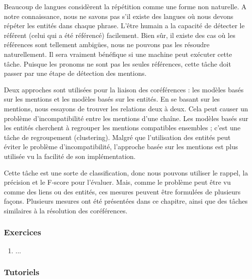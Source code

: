 \documentclass{KodeBook}
\begin{document}
\begin{discussion}
Beaucoup de langues considèrent la répétition comme une forme non naturelle. 
A notre connaissance, nous ne savons pas s'il existe des langues où nous devons répéter les entités dans chaque phrase. 
L'être humain a la capacité de détecter le référent (celui qui a été référencé) facilement. 
Bien sûr, il existe des cas où les références sont tellement ambigües, nous ne pouvons pas les résoudre naturellement. 
Il sera vraiment bénéfique si une machine peut exécuter cette tâche. 
Puisque les pronoms ne sont pas les seules références, cette tâche doit passer par une étape de détection des mentions. 

Deux approches sont utilisées pour la liaison des coréférences : les modèles basés sur les mentions et les modèles basés sur les entités. 
En se basant sur les mentions, nous essayons de trouver les relations deux à deux.
Cela peut causer un problème d'incompatibilité entre les mentions d'une chaîne. 
Les modèles basés sur les entités cherchent à regrouper les mentions compatibles ensembles ; c'est une tâche de regroupement (clustering). 
Malgré que l'utilisation des entités peut éviter le problème d'incompatibilité, l'approche basée sur les mentions est plus utilisée vu la facilité de son implémentation. 

Cette tâche est une sorte de classification, donc nous pouvons utiliser le rappel, la précision et le F-score pour l'évaluer. 
Mais, comme le problème peut être vu comme des liens ou des entités, ces mesures peuvent être formulées de plusieurs façons. 
Plusieurs mesures ont été présentées dans ce chapitre, ainsi que des tâches similaires à la  résolution des coréférences.
\end{discussion}


\subsubsection*{Exercices}

\begin{enumerate}
	\item ...
	
\end{enumerate}

\subsubsection*{Tutoriels}
\end{document}
